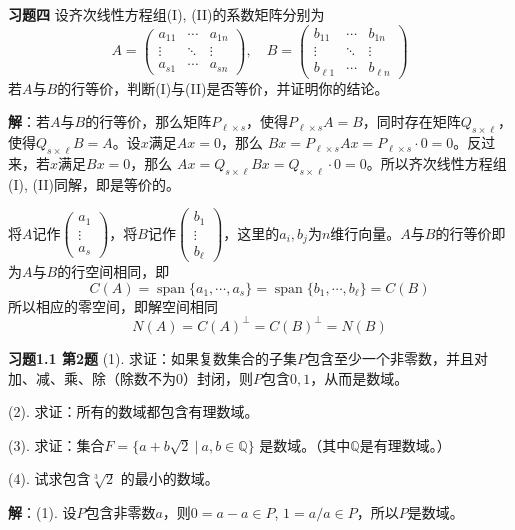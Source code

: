 \newpageorvspace

{\bf 习题四} 设齐次线性方程组(I), (II)的系数矩阵分别为
$$A = \begin{pmatrix} a_{11} & \cdots & a_{1n} \\ \vdots & \ddots & \vdots \\ a_{s1} & \cdots & a_{sn} \end{pmatrix}, \quad B = \begin{pmatrix} b_{11} & \cdots & b_{1n} \\ \vdots & \ddots & \vdots \\ b_{\ell 1} & \cdots & b_{\ell n} \end{pmatrix}$$
若$A$与$B$的行等价，判断(I)与(II)是否等价，并证明你的结论。

{\bf 解}：若$A$与$B$的行等价，那么矩阵$P_{\ell\times s}$，使得$P_{\ell\times s}A = B$，同时存在矩阵$Q_{s\times \ell}$，使得$Q_{s\times \ell}B = A$。设$x$满足$Ax = 0$，那么
$Bx = P_{\ell\times s}Ax = P_{\ell\times s}\cdot 0 = 0$。反过来，若$x$满足$Bx = 0$，那么
$Ax = Q_{s\times \ell}Bx = Q_{s\times \ell}\cdot 0 = 0$。所以齐次线性方程组(I), (II)同解，即是等价的。

将$A$记作$\begin{pmatrix} a_1 \\ \vdots \\ a_s \end{pmatrix}$，将$B$记作$\begin{pmatrix} b_1 \\ \vdots \\ b_{\ell} \end{pmatrix}$，这里的$a_i, b_j$为$n$维行向量。$A$与$B$的行等价即为$A$与$B$的行空间相同，即
$$C(A) = \operatorname{span}\{a_1, \cdots, a_s\} = \operatorname{span}\{b_1, \cdots, b_{\ell}\} = C(B)$$
所以相应的零空间，即解空间相同
$$N(A) = C(A)^{\perp} = C(B)^{\perp} = N(B)$$

\newpageorvspace

{\bf 习题1.1 第2题} (1). 求证：如果复数集合的子集$P$包含至少一个非零数，并且对加、减、乘、除（除数不为$0$）封闭，则$P$包含$0,1$，从而是数域。

(2). 求证：所有的数域都包含有理数域。

(3). 求证：集合$F = \{ a+b\sqrt{2} \ |\ a,b\in\mathbb{Q} \}$ 是数域。（其中$\mathbb{Q}$是有理数域。）

(4). 试求包含$\sqrt[3]{2}$ 的最小的数域。

{\bf 解}：(1). 设$P$包含非零数$a$，则$0 = a-a \in P$, $1 = a/a \in P$，所以$P$是数域。


